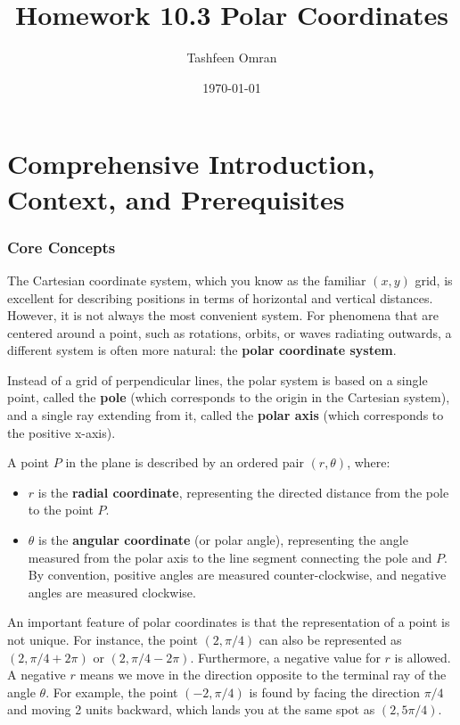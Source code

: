 \documentclass{article}
\title{Homework 10.3 Polar Coordinates}
\author{Tashfeen Omran}
\date{\today}
\begin{document}
\maketitle

\part{Comprehensive Introduction, Context, and Prerequisites}

\section{Core Concepts}

The Cartesian coordinate system, which you know as the familiar \((x, y)\) grid, is excellent for describing positions in terms of horizontal and vertical distances. However, it is not always the most convenient system. For phenomena that are centered around a point, such as rotations, orbits, or waves radiating outwards, a different system is often more natural: the \textbf{polar coordinate system}.

Instead of a grid of perpendicular lines, the polar system is based on a single point, called the \textbf{pole} (which corresponds to the origin in the Cartesian system), and a single ray extending from it, called the \textbf{polar axis} (which corresponds to the positive x-axis).

A point \(P\) in the plane is described by an ordered pair \((r, \theta)\), where:
\begin{itemize}
    \item \(r\) is the \textbf{radial coordinate}, representing the directed distance from the pole to the point \(P\).
    \item \(\theta\) is the \textbf{angular coordinate} (or polar angle), representing the angle measured from the polar axis to the line segment connecting the pole and \(P\). By convention, positive angles are measured counter-clockwise, and negative angles are measured clockwise.
\end{itemize}

An important feature of polar coordinates is that the representation of a point is not unique. For instance, the point \((2, \pi/4)\) can also be represented as \((2, \pi/4 + 2\pi)\) or \((2, \pi/4 - 2\pi)\). Furthermore, a negative value for \(r\) is allowed. A negative \(r\) means we move in the direction opposite to the terminal ray of the angle \(\theta\). For example, the point \((-2, \pi/4)\) is found by facing the direction \(\pi/4\) and moving 2 units backward, which lands you at the same spot as \((2, 5\pi/4)\).
\end{document}
